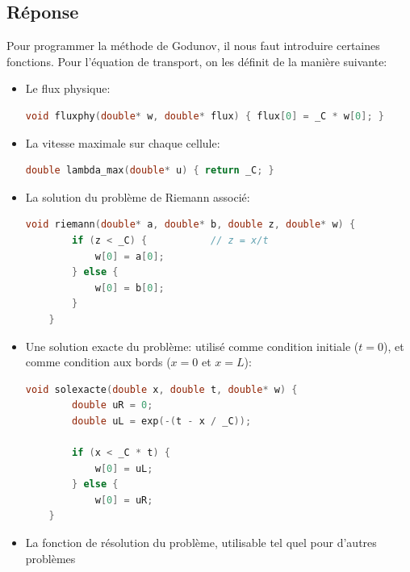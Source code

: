 \documentclass[
	french,
	11pt, %
]{fphw}
\begin{document}
\subsection*{Réponse}
Pour programmer la méthode de Godunov, il nous faut introduire certaines fonctions. Pour l'équation de transport, on les définit de la manière suivante:
\begin{itemize}
	\item Le flux physique: 
	\footnotesize
	\begin{lstlisting}[language=C]
	void fluxphy(double* w, double* flux) { flux[0] = _C * w[0]; }
	\end{lstlisting}
	\normalsize
	\item La vitesse maximale sur chaque cellule: 
	\footnotesize
	\begin{lstlisting}[language=C]
	double lambda_max(double* u) { return _C; }
	\end{lstlisting}
	\normalsize
	\item La solution du problème de Riemann associé: 
	\footnotesize
	\begin{lstlisting}[language=C]
	void riemann(double* a, double* b, double z, double* w) {
		if (z < _C) {       	// z = x/t
			w[0] = a[0];
		} else {
			w[0] = b[0];
		}
	}
	\end{lstlisting}
	\normalsize
	\item Une solution exacte du problème: utilisé comme condition initiale ($t=0$), et comme condition aux bords ($x=0$ et $x=L$): 
	\footnotesize
	\begin{lstlisting}[language=C]
	void solexacte(double x, double t, double* w) {
		double uR = 0;
		double uL = exp(-(t - x / _C));

		if (x < _C * t) {
			w[0] = uL;
		} else {
			w[0] = uR;
	}
	\end{lstlisting}
	\normalsize
	\item La fonction de résolution du problème, utilisable tel quel pour d'autres problèmes


\end{itemize}
\end{document}
